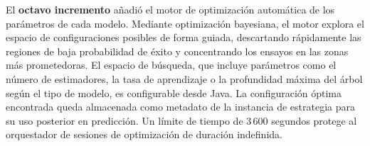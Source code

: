 El \textbf{octavo incremento} añadió el motor de optimización automática de los parámetros de cada modelo. Mediante optimización bayesiana, el motor explora el espacio de configuraciones posibles de forma guiada, descartando rápidamente las regiones de baja probabilidad de éxito y concentrando los ensayos en las zonas más prometedoras. El espacio de búsqueda, que incluye parámetros como el número de estimadores, la tasa de aprendizaje o la profundidad máxima del árbol según el tipo de modelo, es configurable desde Java. La configuración óptima encontrada queda almacenada como metadato de la instancia de estrategia para su uso posterior en predicción. Un límite de tiempo de 3\,600 segundos protege al orquestador de sesiones de optimización de duración indefinida.



